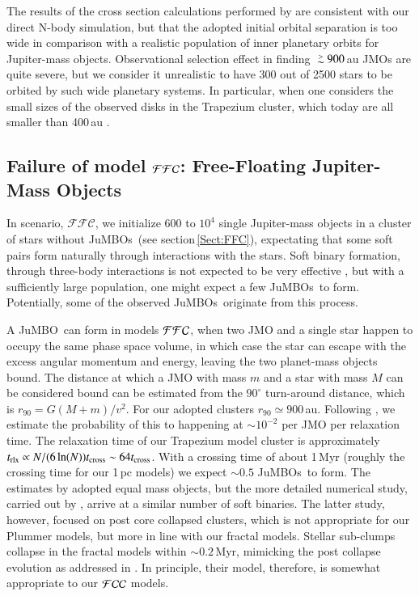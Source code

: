 \documentclass[submission,phys]{lib/SciPost}
\def\apgt{\ {\raise-.5ex\hbox{$\buildrel>\over\sim$}}\ }
\newcommand{\jumbo}{\mbox{JuMBO}}
\newcommand{\jumbos}{\mbox{JuMBOs}}
\begin{document}
The results of the cross section calculations performed by
\cite{2023arXiv231006016W} are consistent with our direct N-body
simulation, but that the adopted initial orbital separation is too
wide in comparison with a realistic population of inner planetary
orbits for Jupiter-mass objects.  Observational selection effect in
finding $\apgt 900$\,au JMOs are quite severe, but we consider it
unrealistic to have 300 out of 2500 stars to be orbited by such wide
planetary systems. In particular, when one considers the small sizes
of the observed disks in the Trapezium cluster, which today are all
smaller than 400\,au \cite{2005A&A...441..195V}.


\subsection{Failure of model ${\cal FFC}$: Free-Floating Jupiter-Mass Objects}\label{sect:FFC_model_results}

In scenario, $\mathcal{FFC}$, we initialize $600$ to $10^4$ single
Jupiter-mass objects in a cluster of stars without \jumbos\, (see
section\,\ref{Sect:FFC}), expectating that some soft pairs form
naturally through interactions with the stars. Soft binary formation,
through three-body interactions is not expected to be very effective
\cite{1976A&A....53..259A}, but with a sufficiently large population,
one might expect a few \jumbos\, to form.  Potentially, some of the
observed \jumbos\, originate from this process.

A \jumbo\, can form in models ${\cal FFC}$, when two JMO and a single
star happen to occupy the same phase space volume, in which case the
star can escape with the excess angular momentum and energy, leaving
the two planet-mass objects bound.  The distance at which a JMO with
mass $m$ and a star with mass $M$ can be considered bound can be
estimated from the $90^\circ$ turn-around distance, which is $r_{90} =
G(M+m)/v^2$.  For our adopted clusters $r_{90} \simeq
900$\,au. Following \cite{1976A&A....53..259A}, we estimate the
probability of this to happening at $\sim 10^{-2}$ per JMO per
relaxation time. The relaxation time of our Trapezium model cluster is
approximately $t_{\rm rlx} \propto N/(6\ln(N)) t_{\rm cross} \sim
64t_{\rm cross}$. With a crossing time of about 1\,Myr (roughly the
crossing time for our 1\,pc models) we expect $\sim 0.5$ \jumbos\, to
form. The estimates by \cite{1976A&A....53..259A} adopted equal mass
objects, but the more detailed numerical study, carried out by
\cite{2011MNRAS.415.1179M}, arrive at a similar number of soft
binaries. The latter study, however, focused on post core collapsed
clusters, which is not appropriate for our Plummer models, but more in
line with our fractal models. Stellar sub-clumps collapse in the
fractal models within $\sim 0.2$\,Myr, mimicking the post collapse
evolution as addressed in \cite{2011MNRAS.415.1179M}. In principle,
their model, therefore, is somewhat appropriate to our ${\cal FCC}$
  models.
\end{document}

